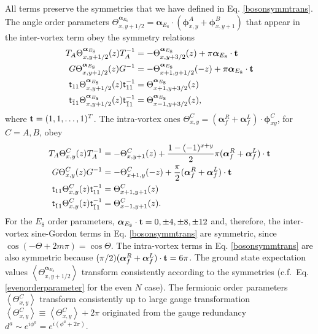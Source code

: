 All terms preserve the symmetries that we have defined in Eq. \eqref{bosonsymmtrans}. The angle order parameters $\Theta^{\boldsymbol\alpha_{E_8}}_{x,y+1/2}=\boldsymbol\alpha_{E_8}\cdot(\boldsymbol\phi^A_{x,y}+\boldsymbol\phi^B_{x,y+1})$ that appear in the inter-vortex term obey the symmetry relations \begin{align}T_A\Theta^{\boldsymbol\alpha_{E_8}}_{x,y+1/2}(z)T_A^{-1}&=-\Theta^{\boldsymbol\alpha_{E_8}}_{x,y+3/2}(z)+\pi\boldsymbol\alpha_{E_8}\cdot{\bf t}\nonumber\\G\Theta^{\boldsymbol\alpha_{E_8}}_{x,y+1/2}(z)G^{-1}&=-\Theta^{\boldsymbol\alpha_{E_8}}_{x+1,y+1/2}(-z)+\pi\boldsymbol\alpha_{E_8}\cdot{\bf t}\nonumber\\\mathsf{t}_{11}\Theta^{\boldsymbol\alpha_{E_8}}_{x,y+1/2}(z)\mathsf{t}_{11}^{-1}&=\Theta^{\boldsymbol\alpha_{E_8}}_{x+1,y+3/2}(z)\nonumber\\\mathsf{t}_{\bar{1}1}\Theta^{\boldsymbol\alpha_{E_8}}_{x,y+1/2}(z)\mathsf{t}_{\bar{1}1}^{-1}&=\Theta^{\boldsymbol\alpha_{E_8}}_{x-1,y+3/2}(z),\end{align} where ${\bf t}=(1,1,\ldots,1)^T$. The intra-vortex ones $\Theta^C_{x,y}=(\boldsymbol\alpha^R_f+\boldsymbol\alpha^L_f)\cdot\boldsymbol\phi^C_{xy}$, for $C=A,B$, obey \begin{align}T_A\Theta^C_{x,y}(z)T_A^{-1}&=-\Theta^C_{x,y+1}(z)+\frac{1-(-1)^{x+y}}{2}\pi(\boldsymbol\alpha^R_f+\boldsymbol\alpha^L_f)\cdot{\bf t}\nonumber\\G\Theta^C_{x,y}(z)G^{-1}&=-\Theta^C_{x+1,y}(-z)+\frac{\pi}{2}(\boldsymbol\alpha^R_f+\boldsymbol\alpha^L_f)\cdot{\bf t}\nonumber\\\mathsf{t}_{11}\Theta^C_{x,y}(z)\mathsf{t}_{11}^{-1}&=\Theta^C_{x+1,y+1}(z)\nonumber\\\mathsf{t}_{\bar{1}1}\Theta^C_{x,y}(z)\mathsf{t}_{\bar{1}1}^{-1}&=\Theta^C_{x-1,y+1}(z).\end{align} For the $E_8$ order parameters, $\boldsymbol\alpha_{E_8}\cdot{\bf t}=0,\pm4,\pm8,\pm12$ and, therefore, the inter-vortex sine-Gordon terms in Eq. \eqref{bosonsymmtrans} are symmetric, since $\cos(-\Theta+2m\pi)=\cos\Theta$. The intra-vortex terms in Eq. \eqref{bosonsymmtrans} are also symmetric because $(\pi/2)(\boldsymbol\alpha^R_f+\boldsymbol\alpha^L_f)\cdot{\bf t}=6\pi$. The ground state expectation values $\left\langle\Theta^{\boldsymbol\alpha_{E_8}}_{x,y+1/2}\right\rangle$ transform consistently according to the symmetries (c.f.~Eq.\eqref{evenorderparameter} for the even $N$ case). The fermionic order parameters $\left\langle\Theta^C_{x,y}\right\rangle$ transform consistently up to large gauge transformation $\left\langle\Theta^C_{x,y}\right\rangle\equiv\left\langle\Theta^C_{x,y}\right\rangle+2\pi$ originated from the gauge redundancy $d^a\sim e^{i\phi^a}=e^{i(\phi^a+2\pi)}$.



